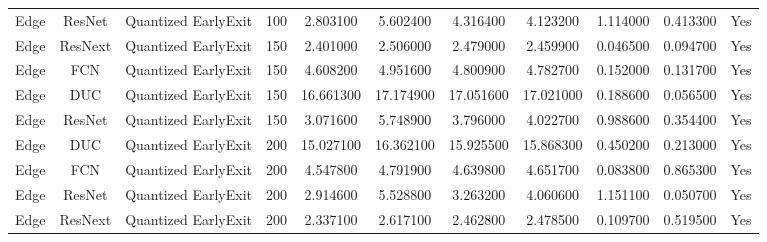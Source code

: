 \begin{tabular}{|c||c||c||c||c||c||c||c||c||c||c|}
Edge & ResNet & Quantized EarlyExit & 100 & 2.803100 & 5.602400 & 4.316400 & 4.123200 & 1.114000 & 0.413300 & Yes \\
Edge & ResNext & Quantized EarlyExit & 150 & 2.401000 & 2.506000 & 2.479000 & 2.459900 & 0.046500 & 0.094700 & Yes \\
Edge & FCN & Quantized EarlyExit & 150 & 4.608200 & 4.951600 & 4.800900 & 4.782700 & 0.152000 & 0.131700 & Yes \\
Edge & DUC & Quantized EarlyExit & 150 & 16.661300 & 17.174900 & 17.051600 & 17.021000 & 0.188600 & 0.056500 & Yes \\
Edge & ResNet & Quantized EarlyExit & 150 & 3.071600 & 5.748900 & 3.796000 & 4.022700 & 0.988600 & 0.354400 & Yes \\
Edge & DUC & Quantized EarlyExit & 200 & 15.027100 & 16.362100 & 15.925500 & 15.868300 & 0.450200 & 0.213000 & Yes \\
Edge & FCN & Quantized EarlyExit & 200 & 4.547800 & 4.791900 & 4.639800 & 4.651700 & 0.083800 & 0.865300 & Yes \\
Edge & ResNet & Quantized EarlyExit & 200 & 2.914600 & 5.528800 & 3.263200 & 4.060600 & 1.151100 & 0.050700 & Yes \\
Edge & ResNext & Quantized EarlyExit & 200 & 2.337100 & 2.617100 & 2.462800 & 2.478500 & 0.109700 & 0.519500 & Yes \\
\bottomrule
\end{tabular}
